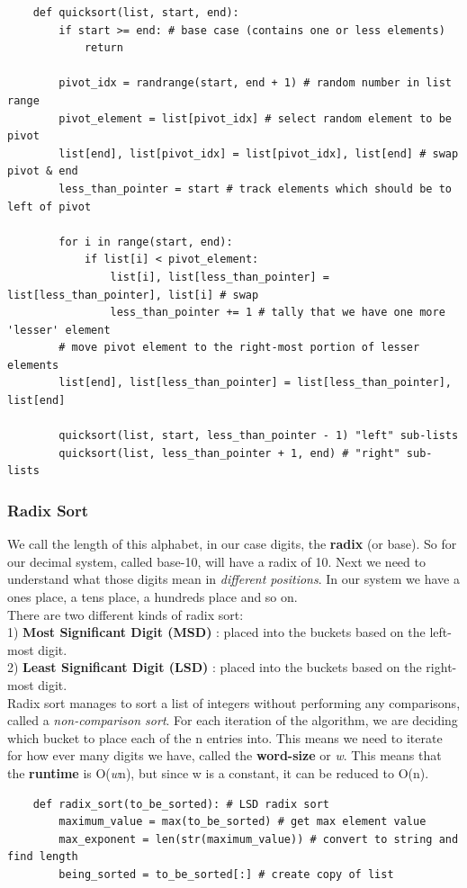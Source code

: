 \documentclass[11pt, a4paper]{article}
\begin{document}
\begin{spacing}{1.1}
\begin{lstlisting}
	def quicksort(list, start, end):
		if start >= end: # base case (contains one or less elements)
			return

		pivot_idx = randrange(start, end + 1) # random number in list range
		pivot_element = list[pivot_idx] # select random element to be pivot
		list[end], list[pivot_idx] = list[pivot_idx], list[end] # swap pivot & end
		less_than_pointer = start # track elements which should be to left of pivot
		
		for i in range(start, end):
			if list[i] < pivot_element:
				list[i], list[less_than_pointer] = list[less_than_pointer], list[i] # swap
				less_than_pointer += 1 # tally that we have one more 'lesser' element
		# move pivot element to the right-most portion of lesser elements
		list[end], list[less_than_pointer] = list[less_than_pointer], list[end]
		
		quicksort(list, start, less_than_pointer - 1) "left" sub-lists
		quicksort(list, less_than_pointer + 1, end)	# "right" sub-lists \end{lstlisting} \vspace*{1mm}
	
	\subsubsection{Radix Sort}
	We call the length of this alphabet, in our case digits, the \textbf{radix} (or base). So for our decimal system, called base-10, will have a radix of 10.	Next we need to understand what those digits mean in \textit{different positions}. In our system we have a ones place, a tens place, a hundreds place and so on. \vspace*{1.5mm} \\
	There are two different kinds of radix sort: \\
	\hspace*{3mm} 1) \textbf{Most Significant Digit (MSD)} : placed into the buckets based on the left-most digit. \\
	\hspace*{3mm} 2) \textbf{Least Significant Digit (LSD)} : placed into the buckets based on the right-most digit. \vspace*{1.5mm} \\
	Radix sort manages to sort a list of integers without performing any comparisons, called a \textit{non-comparison sort}. For each iteration of the algorithm, we are deciding which bucket to place each of the n entries into. This means we need to iterate for how ever many digits we have, called the \textbf{word-size} or \textit{w}. This means that the \textbf{runtime} is O(\textit{w}n), but since w is a constant, it can be reduced to O(n).
	\begin{lstlisting}
	def radix_sort(to_be_sorted): # LSD radix sort
		maximum_value = max(to_be_sorted) # get max element value
		max_exponent = len(str(maximum_value)) # convert to string and find length
		being_sorted = to_be_sorted[:] # create copy of list
		

\end{lstlisting}
\end{spacing}
\end{document}
